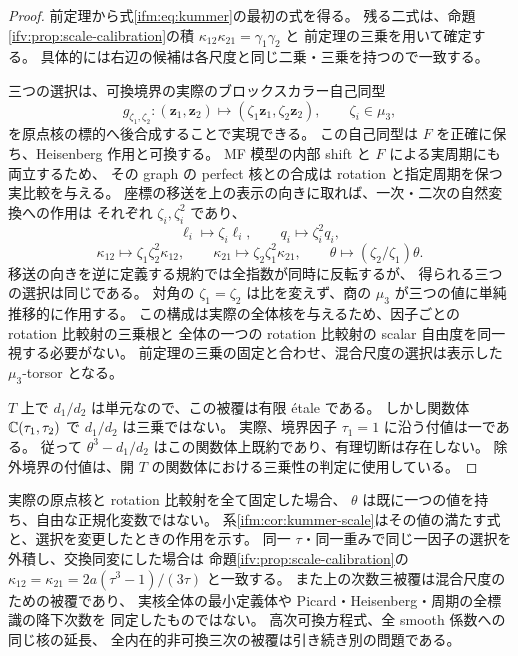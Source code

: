\begin{proof}
前定理から式\eqref{ifm:eq:kummer}の最初の式を得る。
残る二式は、命題\ref{ifv:prop:scale-calibration}の積
$\kappa_{12}\kappa_{21}=\gamma_1\gamma_2$ と
前定理の三乗を用いて確定する。
具体的には右辺の候補は各尺度と同じ二乗・三乗を持つので一致する。

三つの選択は、可換境界の実際のブロックスカラー自己同型
\[
 g_{\zeta_1,\zeta_2}:
       (\mathbf z_1,\mathbf z_2)\longmapsto
                 (\zeta_1\mathbf z_1,\zeta_2\mathbf z_2),
                    \qquad \zeta_i\in\mu_3,
\]
を原点核の標的へ後合成することで実現できる。
この自己同型は $F$ を正確に保ち、Heisenberg 作用と可換する。
MF 模型の内部 shift と $F$ による実周期にも両立するため、
その graph の perfect 核との合成は rotation と指定周期を保つ実比較を与える。
座標の移送を上の表示の向きに取れば、一次・二次の自然変換への作用は
それぞれ $\zeta_i,\zeta_i^2$ であり、
\[
 \ell_i\longmapsto\zeta_i\ell_i,\qquad
 q_i\longmapsto\zeta_i^2q_i,
\]
\[
 \kappa_{12}\longmapsto\zeta_1\zeta_2^2\kappa_{12},\qquad
 \kappa_{21}\longmapsto\zeta_2\zeta_1^2\kappa_{21},\qquad
 \theta\longmapsto(\zeta_2/\zeta_1)\theta.
\]
移送の向きを逆に定義する規約では全指数が同時に反転するが、
得られる三つの選択は同じである。
対角の $\zeta_1=\zeta_2$ は比を変えず、商の $\mu_3$ が三つの値に単純推移的に作用する。
この構成は実際の全体核を与えるため、因子ごとの rotation 比較射の三乗根と
全体の一つの rotation 比較射の scalar 自由度を同一視する必要がない。
前定理の三乗の固定と合わせ、混合尺度の選択は表示した $\mu_3$-torsor となる。

$T$ 上で $d_1/d_2$ は単元なので、この被覆は有限 \'etale である。
しかし関数体 $\mathbb C(\tau_1,\tau_2)$ で $d_1/d_2$ は三乗ではない。
実際、境界因子 $\tau_1=1$ に沿う付値は一である。
従って $\theta^3-d_1/d_2$ はこの関数体上既約であり、有理切断は存在しない。
除外境界の付値は、開 $T$ の関数体における三乗性の判定に使用している。
\end{proof}

\begin{remark}[固定した選択と未決定の対象]
\label{ifm:rem:scope}
実際の原点核と rotation 比較射を全て固定した場合、
$\theta$ は既に一つの値を持ち、自由な正規化変数ではない。
系\ref{ifm:cor:kummer-scale}はその値の満たす式と、選択を変更したときの作用を示す。
同一 $\tau$・同一重みで同じ一因子の選択を外積し、交換同変にした場合は
命題\ref{ifv:prop:scale-calibration}の
$\kappa_{12}=\kappa_{21}=2a(\tau^3-1)/(3\tau)$ と一致する。
また上の次数三被覆は混合尺度のための被覆であり、
実核全体の最小定義体や Picard・Heisenberg・周期の全標識の降下次数を
同定したものではない。
高次可換方程式、全 smooth 係数への同じ核の延長、
全内在的非可換三次の被覆は引き続き別の問題である。
\end{remark}
